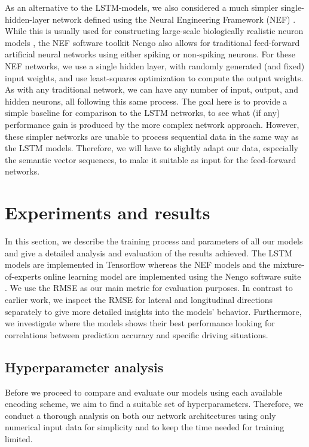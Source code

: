 As an alternative to the \ac{LSTM}-models, we also considered a much simpler single-hidden-layer network defined using the Neural Engineering Framework (\ac{NEF}) \cite{Eliasmith2003}.
While this is usually used for constructing large-scale biologically realistic neuron models \cite{Eliasmith2012}, the \ac{NEF} software toolkit \acs{Nengo} \cite{Bekolay2014} also allows for traditional feed-forward artificial neural networks using either spiking or non-spiking neurons.
For these \ac{NEF} networks, we use a single hidden layer, with randomly generated (and fixed) input weights, and use least-squares optimization to compute the output weights.
As with any traditional network, we can have any number of input, output, and hidden neurons, all following this same process.
The goal here is to provide a simple baseline for comparison to the \ac{LSTM} networks, to see what (if any) performance gain is produced by the more complex network approach.
However, these simpler networks are unable to process sequential data in the same way as the \ac{LSTM} models.
Therefore, we will have to slightly adapt our data, especially the semantic vector sequences, to make it suitable as input for the feed-forward networks.

\section{Experiments and results}
\label{sec:experiments}
In this section, we describe the training process and parameters of all our models and give a detailed analysis and evaluation of the results achieved.
The \ac{LSTM} models are implemented in Tensorflow \cite{Abadi2016} whereas the \ac{NEF} models and the mixture-of-experts online learning model are implemented using the \acs{Nengo} software suite \cite{Bekolay2014}.
We use the \ac{RMSE} as our main metric for evaluation purposes.
In contrast to earlier work, we inspect the \ac{RMSE} for lateral and longitudinal directions separately to give more detailed insights into the models' behavior.
Furthermore, we investigate where the models shows their best performance looking for correlations between prediction accuracy and specific driving situations.

\subsection{Hyperparameter analysis}
\label{subsec:hyperparam_analysis}
Before we proceed to compare and evaluate our models using each available encoding scheme, we aim to find a suitable set of hyperparameters.
Therefore, we conduct a thorough analysis on both our network architectures using only numerical input data for simplicity and to keep the time needed for training limited.

